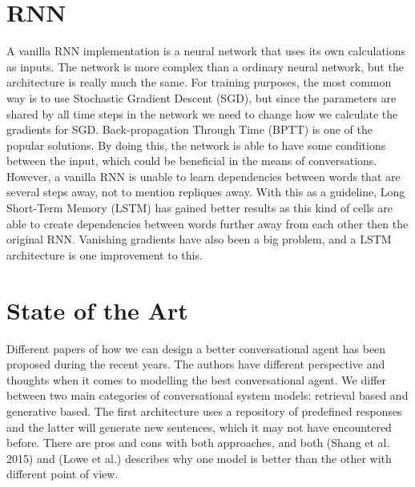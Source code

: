 \documentclass{article} %
\begin{document}
\section{RNN}
A vanilla RNN implementation is a neural network that uses its own calculations as inputs. The network is more complex than a ordinary neural network, but the architecture is really much the same. For training purposes, the most common way is to use Stochastic Gradient Descent (SGD), but since the parameters are shared by all time steps in the network we need to change how we calculate the gradients for SGD. Back-propagation Through Time (BPTT) is one of the popular solutions. By doing this, the network is able to have some conditions between the input, which could be beneficial in the means of conversations. However, a vanilla RNN is unable to learn dependencies between words that are several steps away, not to mention repliques away. With this as a guideline, Long Short-Term Memory (LSTM) has gained better results as this kind of cells are able to create dependencies between words further away from each other then the original RNN. Vanishing gradients have also been a big problem, and a LSTM architecture is one improvement to this.

\section{State of the Art}
Different papers of how we can design a better conversational agent has been proposed during the recent years. The authors have different perspective and thoughts when it comes to modelling the best conversational agent. We differ between two main categories of conversational system models: retrieval based and generative based. The first architecture uses a repository of predefined responses and the latter will generate new sentences, which it may not have encountered before. There are pros and cons with both approaches, and both (Shang et al. 2015) and (Lowe et al.) describes why one model is better than the other with different point of view. 
\end{document}
